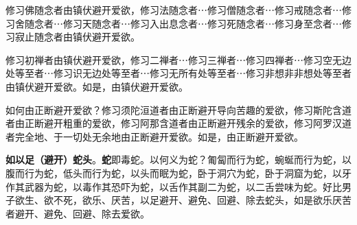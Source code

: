 修习佛随念者由镇伏避开爱欲，修习法随念者⋯修习僧随念者⋯修习戒随念者⋯修习舍随念者⋯修习天随念者⋯修习入出息念者⋯修习死随念者⋯修习身至念者⋯修习寂止随念者由镇伏避开爱欲。


修习初禅者由镇伏避开爱欲，修习二禅者⋯修习三禅者⋯修习四禅者⋯修习空无边处等至者⋯修习识无边处等至者⋯修习无所有处等至者⋯修习非想非非想处等至者由镇伏避开爱欲。如是，由镇伏避开爱欲。


如何由正断避开爱欲？修习须陀洹道者由正断避开导向苦趣的爱欲，修习斯陀含道者由正断避开粗重的爱欲，修习阿那含道者由正断避开残余的爱欲，修习阿罗汉道者完全地、于一切处无余地由正断避开爱欲。如是，由正断避开爱欲。


\textbf{如以足（避开）蛇头}。\textbf{蛇}即毒蛇。以何义为蛇？匍匐而行为蛇，蜿蜒而行为蛇，以腹而行为蛇，低头而行为蛇，以头而眠为蛇，卧于洞穴为蛇，卧于洞窟为蛇，以牙作其武器为蛇，以毒作其恐吓为蛇，以舌作其副二为蛇，以二舌尝味为蛇。好比男子欲生、欲不死，欲乐、厌苦，以足避开、避免、回避、除去蛇头，如是欲乐厌苦者避开、避免、回避、除去爱欲。


